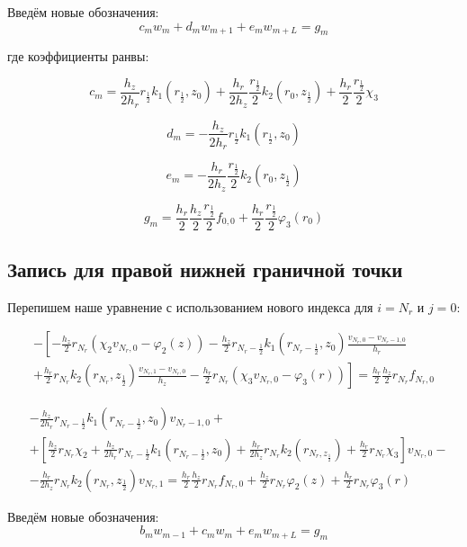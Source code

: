 Введём новые обозначения:
\[
  c_m w_m + d_m w_{m + 1} + e_m w_{m + L} = g_m
\]

где коэффициенты ранвы:

\[
  c_m = \frac{h_z}{2 h_r} r_{\frac{1}{2}} k_1(r_{\frac{1}{2}}, z_0) + \frac{h_r}{2 h_z} \frac{r_{\frac{1}{2}}}{2} k_2(r_0, z_{\frac{1}{2}}) + \frac{h_r}{2} \frac{r_\frac{1}{2}}{2} \chi_3
\]

\[
  d_m = - \frac{h_z}{2 h_r} r_\frac{1}{2} k_1(r_\frac{1}{2}, z_0)
\]

\[
  e_m = - \frac{h_r}{2 h_z} \frac{r_{\frac{1}{2}}}{2} k_2(r_0, z_{\frac{1}{2}})
\]

\[
  g_m = \frac{h_r}{2} \frac{h_z}{2} \frac{r_{\frac{1}{2}}}{2} f_{0, 0} + \frac{h_r}{2} \frac{r_{\frac{1}{2}}}{2} \varphi_3(r_0)
\]

\subsection{Запись для правой нижней граничной точки}

Перепишем наше уравнение с использованием нового индекса для $i = N_r $ и $ j = 0 $:

\begin{align*}
  - \left [ 
  -\frac{h_z}{2} r_{N_r} (\chi_2 v_{N_r, 0} - \varphi_2(z) )
  - \frac{h_z}{2} r_{N_r-\frac{1}{2}} k_1(r_{N_r-\frac{1}{2}}, z_0) \frac{v_{N_r, 0} - v_{N_r - 1, 0}}{h_{r}}
  \right . \\
  \left .
  + \frac{h_r}{2} r_{N_r} k_2(r_{N_r}, z_{\frac{1}{2}}) \frac{v_{N_r, 1} - v_{N_r, 0}}{h_{z}}
  - \frac{h_r}{2} r_{N_r} (\chi_3 v_{N_r, 0} - \varphi_3(r))
  \right ]  = \frac{h_r}{2} \frac{h_z}{2} r_{N_r} f_{N_r, 0}
\end{align*}

\begin{align*}
  & - \frac{h_z}{2 h_r} r_{N_r - \frac{1}{2}} k_1 (r_{N_r - \frac{1}{2}}, z_0) v_{N_r - 1, 0} +\\
  & + \left[
    \frac{h_z}{2} r_{N_r} \chi_2 + \frac{h_z}{2 h_r} r_{N_r - \frac{1}{2}} k_1 (r_{N_r - \frac{1}{2}}, z_0) 
    + \frac{h_r}{2 h_z} r_{N_r} k_2(r_{N_r, z_{\frac{1}{2}}}) + \frac{h_r}{2} r_{N_r} \chi_3
  \right] v_{N_r, 0} - \\
  & - \frac{h_r}{2 h_z} r_{N_r} k_2(r_{N_r}, z_{\frac{1}{2}}) v_{N_r, 1}
  = \frac{h_r}{2} \frac{h_z}{2} r_{N_r} f_{N_r, 0} + \frac{h_z}{2} r_{N_r} \varphi_2(z) + \frac{h_r}{2} r_{N_r} \varphi_3(r)
\end{align*}

Введём новые обозначения:
\[
  b_m w_{m - 1} + c_m w_m + e_m w_{m + L} = g_m
\]

